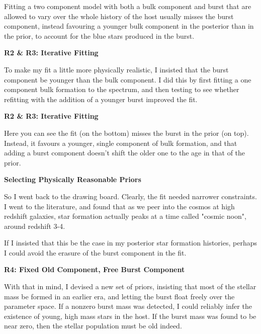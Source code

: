 \documentclass[a4paper,11pt]{article}
\begin{document}
\noindent \newline Fitting a two component model with both a bulk component and burst
that are allowed to vary over the whole history of the host usually misses the
burst component, instead favouring a younger bulk component in the posterior
than in the prior, to account for the blue stars produced in the burst.

\noindent \newline \textbf{R2 \& R3: Iterative Fitting}

\noindent \newline To make my fit a little more physically realistic, I insisted that the burst
component be younger than the bulk component. I did this by first fitting a one
component bulk formation to the spectrum, and then testing to see whether
refitting with the addition of a younger burst improved the fit.

\noindent \newline \textbf{R2 \& R3: Iterative Fitting}

\noindent \newline Here you can see the fit (on the bottom) misses the burst in the prior (on top).
Instead, it favours a younger, single component of bulk formation, and that
adding a burst component doesn't shift the older one to the age in that of the prior.

\noindent \newline \textbf{Selecting Physically Reasonable Priors}

\noindent \newline So I went back to the drawing board. Clearly, the fit needed narrower constraints.
I went to the literature, and found that as we peer into the cosmos at high
redshift galaxies, star formation actually peaks at a time called "cosmic noon",
around redshift 3-4.

\noindent \newline If I insisted that this be the case in my posterior star formation histories,
perhaps I could avoid the erasure of the burst component in the fit.


\noindent \newline \textbf{R4: Fixed Old Component, Free Burst Component}

\noindent \newline With that in mind, I devised a new set of priors, insisting that most of the
stellar mass be formed in an earlier era, and letting the burst float freely
over the parameter space. If a nonzero burst mass was detected, I could
reliably infer the existence of young, high mass stars in the host. If the burst
mass was found to be near zero, then the stellar population must be old indeed.
\end{document}
